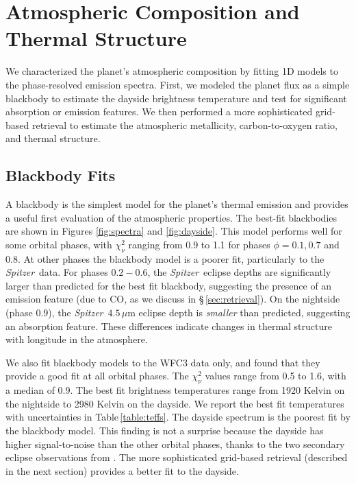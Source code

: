 \documentclass[twocolumn]{aastex61}
\newcommand{\project}[1]{\textsl{#1}}
\newcommand{\Spitzer}{\project{Spitzer}}
\begin{document}
\section{Atmospheric Composition and Thermal Structure}
\label{sec:composition}
We characterized the planet's atmospheric composition by fitting 1D models to the phase-resolved emission spectra.  First, we modeled the planet flux as a simple blackbody to estimate the dayside brightness temperature and test for significant absorption or emission features. We then performed a more sophisticated grid-based retrieval to estimate the atmospheric metallicity, carbon-to-oxygen ratio, and thermal structure.

\subsection{Blackbody Fits}
A blackbody is the simplest model for the planet's thermal emission and provides a useful first evaluation of the atmospheric properties. The best-fit blackbodies are shown in Figures \ref{fig:spectra} and \ref{fig:dayside}. This model performs well for some orbital phases, with $\chi^2_\nu$ ranging from 0.9 to 1.1 for phases $\phi = 0.1, 0.7$ and $0.8$. At other phases the blackbody model is a poorer fit, particularly to the \Spitzer\ data. For phases $0.2 - 0.6$, the \Spitzer\ eclipse depths are significantly larger than predicted for the best fit blackbody, suggesting the presence of an emission feature (due to CO, as we discuss in \S\,\ref{sec:retrieval}). On the nightside (phase $0.9$), the \Spitzer\ $4.5\,\mu$m eclipse depth is \emph{smaller} than predicted, suggesting an absorption feature. These differences indicate changes in thermal structure with longitude in the atmosphere.

We also fit blackbody models to the WFC3 data only, and found that they provide a good fit at all orbital phases. The $\chi^2_\nu$ values range from 0.5 to 1.6, with a median of 0.9. The best fit brightness temperatures range from 1920 Kelvin on the nightside to 2980 Kelvin on the dayside. We report the best fit temperatures with uncertainties in Table\,\ref{table:teffs}.  The dayside spectrum is the poorest fit by the blackbody model. This finding is not a surprise because the dayside has higher signal-to-noise than the other orbital phases, thanks to the two secondary eclipse observations from \cite{cartier17}. The more sophisticated grid-based retrieval (described in the next section) provides a better fit to the dayside.
\end{document}
